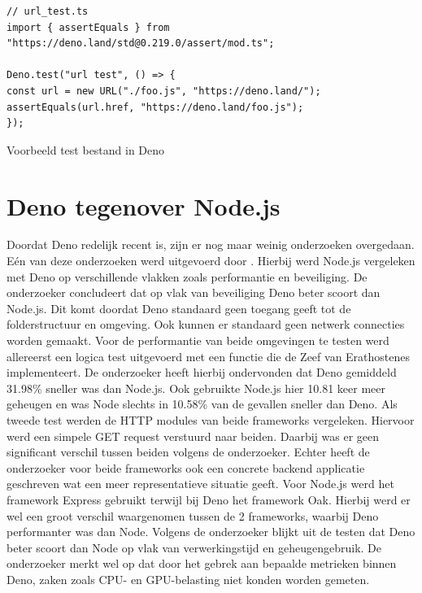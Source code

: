 \begin{listing}[H]
    \centering
    \begin{verbatim}
// url_test.ts
import { assertEquals } from "https://deno.land/std@0.219.0/assert/mod.ts";

Deno.test("url test", () => {
const url = new URL("./foo.js", "https://deno.land/");
assertEquals(url.href, "https://deno.land/foo.js");
});
        \end{verbatim}
        \caption[Deno test]{\label{list:test}Voorbeeld test bestand in Deno ~\autocite{DenoLand2023}} 
\end{listing}

\section{Deno tegenover Node.js}
Doordat Deno redelijk recent is, zijn er nog maar weinig onderzoeken overgedaan. 
Eén van deze onderzoeken werd uitgevoerd door \textcite{VanKerkvoorde2021}.
Hierbij werd Node.js vergeleken met Deno op verschillende vlakken zoals performantie en beveiliging.
De onderzoeker concludeert dat op vlak van beveiliging Deno beter scoort dan Node.js. Dit komt doordat Deno
standaard geen toegang geeft tot de folderstructuur en omgeving. Ook kunnen er standaard geen netwerk connecties worden gemaakt.
Voor de performantie  van beide omgevingen te testen werd allereerst een logica test
uitgevoerd met een functie die de Zeef van Erathostenes implementeert. De onderzoeker heeft hierbij
ondervonden dat Deno gemiddeld 31.98\% sneller
was dan Node.js. Ook gebruikte Node.js hier 10.81 keer meer geheugen en was Node slechts in 10.58\% van de gevallen sneller dan Deno.
Als tweede test werden de HTTP modules van beide frameworks vergeleken.
Hiervoor werd een simpele GET request verstuurd naar beiden. Daarbij was er geen significant
verschil tussen beiden volgens de onderzoeker.
Echter heeft de onderzoeker voor beide frameworks ook een concrete backend applicatie geschreven wat een meer representatieve situatie geeft.
Voor Node.js werd het framework Express gebruikt terwijl bij Deno het framework Oak. Hierbij werd er wel een groot
verschil waargenomen tussen de 2 frameworks, waarbij Deno performanter was dan Node. Volgens de onderzoeker blijkt uit de testen dat Deno
beter scoort dan Node op vlak van verwerkingstijd en geheugengebruik. De onderzoeker merkt
wel op dat door het gebrek aan bepaalde metrieken binnen Deno, zaken zoals CPU- en GPU-belasting niet konden worden gemeten.


